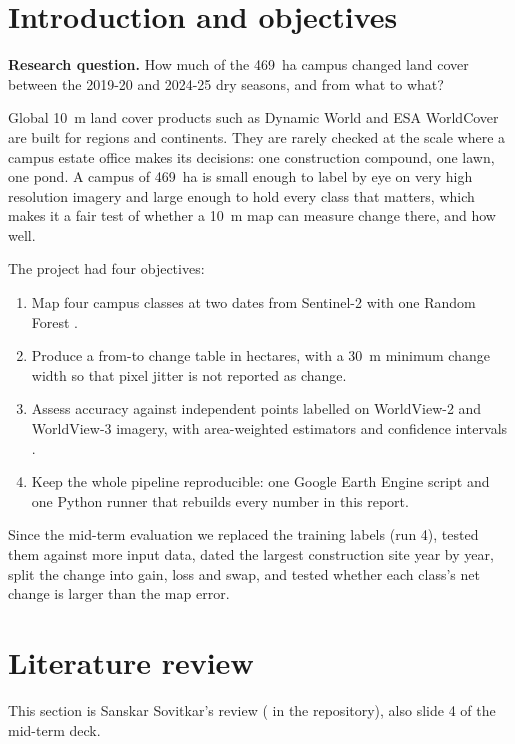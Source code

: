 \documentclass[11pt,a4paper]{article}
\begin{document}
\clearpage
\section{Introduction and objectives}

\textbf{Research question.} How much of the 469~ha campus changed land cover between the 2019-20 and 2024-25 dry seasons, and from what to what?

Global 10~m land cover products such as Dynamic World \citep{brown2022} and ESA WorldCover are built for regions and continents. They are rarely checked at the scale where a campus estate office makes its decisions: one construction compound, one lawn, one pond. A campus of 469~ha is small enough to label by eye on very high resolution imagery and large enough to hold every class that matters, which makes it a fair test of whether a 10~m map can measure change there, and how well.

The project had four objectives:
\begin{enumerate}
  \item Map four campus classes at two dates from Sentinel-2 \citep{drusch2012} with one Random Forest \citep{breiman2001}.
  \item Produce a from-to change table in hectares, with a 30~m minimum change width so that pixel jitter is not reported as change.
  \item Assess accuracy against independent points labelled on WorldView-2 and WorldView-3 imagery, with area-weighted estimators and confidence intervals \citep{olofsson2014}.
  \item Keep the whole pipeline reproducible: one Google Earth Engine script \citep{gorelick2017} and one Python runner that rebuilds every number in this report.
\end{enumerate}

Since the mid-term evaluation we replaced the training labels (run 4), tested them against more input data, dated the largest construction site year by year, split the change into gain, loss and swap, and tested whether each class's net change is larger than the map error.

\section{Literature review}
{\color{muted}\small This section is Sanskar Sovitkar's review ( in the repository), also slide 4 of the mid-term deck.}\medskip
\end{document}
